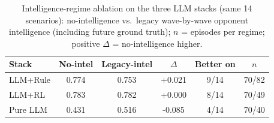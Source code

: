 \begin{table}[t]
\centering
\caption{Intelligence-regime ablation on the three LLM stacks (same 14 scenarios): no-intelligence vs.\ legacy wave-by-wave opponent intelligence (including future ground truth); $n$ = episodes per regime; positive $\Delta$ = no-intelligence higher.}
\label{tab:nointel}
\footnotesize
\setlength{\tabcolsep}{3pt}
\begin{tabular}{@{}lccccc@{}}
\toprule
Stack & No-intel & Legacy-intel & $\Delta$ & Better on & $n$ \\
\midrule
LLM+Rule & 0.774 & 0.753 & +0.021 & 9/14 & 70/82 \\
LLM+RL & 0.783 & 0.782 & +0.000 & 8/14 & 70/49 \\
Pure LLM & 0.431 & 0.516 & -0.085 & 4/14 & 70/40 \\
\bottomrule
\end{tabular}
\end{table}
